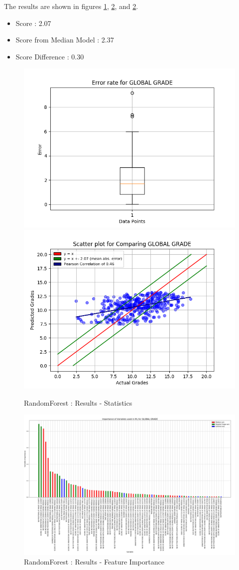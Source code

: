 \documentclass[a4paper,11pt]{report}
\numberwithin{figure}{chapter} %
\begin{document}
    The results are shown in figures \ref{fig:test3_1}, \ref{fig:test3_2}, and \ref{fig:test3_2}.
    \begin{itemize}
        \item[\textbullet] Score : 2.07
        \item[\textbullet] Score from Median Model : 2.37
        \item[\textbullet] Score Difference : 0.30
    \end{itemize}

      \begin{figure}[H]
      \centering
      \includegraphics[width=.40\linewidth]{plots/cv_boxplot_GLOBAL_GRADE_2018-05-29_01_56_26.png}
      \includegraphics[width=.40\linewidth]{plots/cv_comp_GLOBAL_GRADE_2018-05-29_01_56_26.png}
      \caption{RandomForest : Results - Statistics}
      \label{fig:test3_1}
      \end{figure}

      \begin{figure}[H]
      \centering
      \includegraphics[width=.95\linewidth]{plots/var_importance_GLOBAL_GRADE_2018-05-29_11_04_26.png}
      \caption{RandomForest : Results - Feature Importance}
      \label{fig:test3_2}
      \end{figure}
\end{document}
